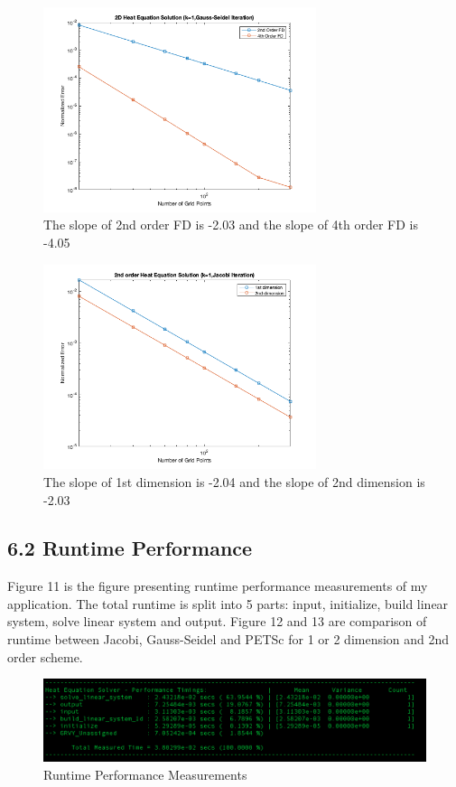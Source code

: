 \documentclass{article}
\begin{document}
\begin{figure}[h!]
  \includegraphics[width=8cm]{figure_8}
  \caption{The slope of 2nd order FD is -2.03 and the slope of 4th order FD is -4.05}
\end{figure}

\begin{figure}[h!]
  \includegraphics[width=8cm]{figure_9}
  \caption{The slope of 1st dimension is -2.04 and the slope of 2nd dimension is -2.03}
\end{figure}

\subsection*{6.2 Runtime Performance}
Figure 11 is the figure presenting runtime performance measurements of my application. The total runtime is split into 5 parts: input, initialize, build linear system, solve linear system and output. Figure 12 and 13 are comparison of runtime between Jacobi, Gauss-Seidel and PETSc for 1 or 2 dimension and 2nd order scheme.

\begin{figure}
  \includegraphics[width=\linewidth]{figure_10}
  \caption{Runtime Performance Measurements}
\end{figure}
\end{document}
